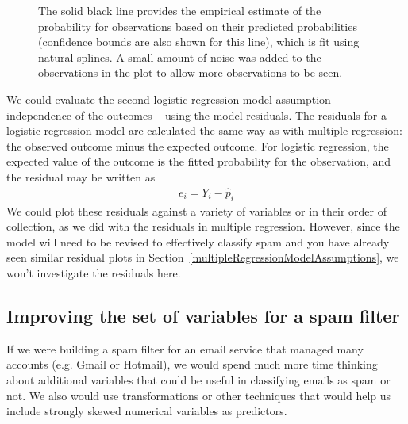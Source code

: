 \begin{figure}
  \centering
  \caption{The solid black line provides the empirical
      estimate of the probability for observations based
      on their predicted probabilities
      (confidence bounds are also shown for this line),
      which is fit using natural splines.
      A small amount of noise was added to the observations
      in the plot to allow more observations to be seen.}
  \label{logisticModelSpline}
\end{figure}

We could evaluate the second logistic regression model assumption -- independence of the outcomes -- using the model residuals. The residuals for a logistic regression model are calculated the same way as with multiple regression: the observed outcome minus the expected outcome. For logistic regression, the expected value of the outcome is the fitted probability for the observation, and the residual may be written as
\begin{align*}
e_i = Y_i - \hat{p}_i
\end{align*}
We could plot these residuals against a variety of variables or in their order of collection, as we did with the residuals in multiple regression. However, since the model will need to be revised to effectively classify spam and you have already seen similar residual plots in Section~\ref{multipleRegressionModelAssumptions}, we won't investigate the residuals here.



\subsection{Improving the set of variables for a spam filter}
\label{improvingTheSetOfVariablesForASpamFilter}

If we were building a spam filter for an email service that managed many accounts (e.g. Gmail or Hotmail), we would spend much more time thinking about additional variables that could be useful in classifying emails as spam or not. We also would use transformations or other techniques that would help us include strongly skewed numerical variables as predictors.

